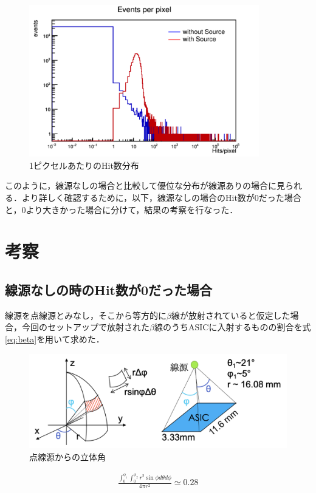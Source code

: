 \begin{figure}[h]
  \centering
  \includegraphics[width=10cm]{./figure/selfhitfreq.png}
  \caption{1ピクセルあたりのHit数分布}
  \label{fig:selfhitfreq}
\end{figure}

このように，線源なしの場合と比較して優位な分布が線源ありの場合に見られる．より詳しく確認するために，以下，線源なしの場合のHit数が0だった場合と，0より大きかった場合に分けて，結果の考察を行なった．

\section{考察}
\label{sec:selfsum}
\subsection*{線源なしの時のHit数が0だった場合}
線源を点線源とみなし，そこから等方的に$\beta$線が放射されていると仮定した場合，今回のセットアップで放射された$\beta$線のうちASICに入射するものの割合を式\ref{eq:beta}を用いて求めた．
\begin{figure}[h]
  \centering
  \includegraphics[width=12cm]{./figure/selfarg.png}
  \caption{点線源からの立体角}
\end{figure}

\begin{eqnarray}
  \label{eq:beta}
  \frac{\int^{\phi_1}_0 \int^{\phi_2}_0 r^2 \sin \phi d\theta d\phi}{4 \pi r^2} \simeq 0.28
\end{eqnarray}

